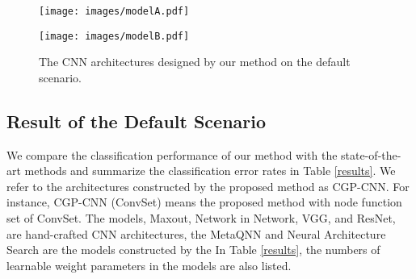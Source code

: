 \begin{figure*}[!t]
 \begin{minipage}[b]{0.45\linewidth}
  \centering
  \texttt{[image: images/modelA.pdf]}
  \label{modelA}
 \end{minipage}
 \begin{minipage}[b]{0.45\linewidth}
  \centering
  \texttt{[image: images/modelB.pdf]}
  \label{modelB}
 \end{minipage}
 \caption{The CNN architectures designed by our method on the default scenario.}\label{models}
\end{figure*}


\subsection{Result of the Default Scenario}
We compare the classification performance of our method with the state-of-the-art methods and summarize the classification error rates in Table \ref{results}. We refer to the architectures constructed by the proposed method as CGP-CNN. For instance, CGP-CNN (ConvSet) means the proposed method with  node function set of ConvSet. The models, Maxout, Network in Network, VGG, and ResNet, are hand-crafted CNN architectures,  the MetaQNN and Neural Architecture Search are the models constructed by the 
In Table \ref{results}, the numbers of learnable weight parameters in the models are also listed.

